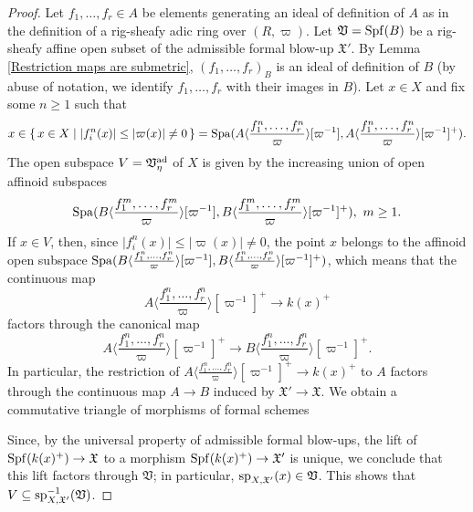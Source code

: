 \documentclass[12pt,twoside,a4paper]{article}
\theoremstyle{definition}
\theoremstyle{remark}
\newcommand\ad{{\rm ad}}
\newcommand\spc{{\rm sp}}
\newcommand\Spa{{\rm Spa}}
\newcommand\Spf{{\rm Spf}}
\begin{document}
\begin{proof}
Let $f_1,\dots, f_r\in A$ be elements generating an ideal of definition of $A$ as in the definition of a rig-sheafy adic ring over $(R, \varpi)$. Let $\mathfrak{V}=\Spf(B)$ be a rig-sheafy affine open subset of the admissible formal blow-up $\mathfrak{X}'$. By Lemma \ref{Restriction maps are submetric}, $(f_1,\dots, f_r)_{B}$ is an ideal of definition of $B$ (by abuse of notation, we identify $f_1,\dots, f_r$ with their images in $B$). Let $x\in X$ and fix some $n\geq1$ such that \begin{equation*}x\in \{\, x\in X\mid \vert f_{i}^{n}(x)\vert\leq\vert\varpi(x)\vert\neq 0\,\}=\Spa(A\langle\frac{f_1^{n},\dots, f_r^{n}}{\varpi}\rangle[\varpi^{-1}], A\langle\frac{f_1^{n},\dots, f_r^{n}}{\varpi}\rangle[\varpi^{-1}]^{+}).\end{equation*}The open subspace $V=\mathfrak{V}_{\eta}^{\ad}$ of $X$ is given by the increasing union of open affinoid subspaces \begin{equation*}\Spa(B\langle\frac{f_1^{m},\dots, f_r^{m}}{\varpi}\rangle[\varpi^{-1}], B\langle\frac{f_1^{m},\dots, f_r^{m}}{\varpi}\rangle[\varpi^{-1}]^{+}), \ m\geq1.\end{equation*}If $x\in V$, then, since $\vert f_{i}^{n}(x)\vert\leq \vert\varpi(x)\vert\neq 0$, the point $x$ belongs to the affinoid open subspace $\Spa(B\langle\frac{f_1^{n},\dots, f_r^{n}}{\varpi}\rangle[\varpi^{-1}], B\langle\frac{f_1^{n},\dots, f_r^{n}}{\varpi}\rangle[\varpi^{-1}]^{+})$, which means that the continuous map \begin{equation*}A\langle\frac{f_1^{n},\dots, f_r^{n}}{\varpi}\rangle[\varpi^{-1}]^{+}\to k(x)^{+}\end{equation*}factors through the canonical map \begin{equation*}A\langle\frac{f_1^{n},\dots, f_r^{n}}{\varpi}\rangle[\varpi^{-1}]^{+}\to B\langle\frac{f_1^{n},\dots, f_r^{n}}{\varpi}\rangle[\varpi^{-1}]^{+}.\end{equation*}In particular, the restriction of $A\langle\frac{f_1^{n},\dots, f_r^{n}}{\varpi}\rangle[\varpi^{-1}]^{+}\to k(x)^{+}$ to $A$ factors through the continuous map $A\to B$ induced by $\mathfrak{X}'\to \mathfrak{X}$. We obtain a commutative triangle of morphisms of formal schemes \begin{center}\end{center}Since, by the universal property of admissible formal blow-ups, the lift of $\Spf(k(x)^{+})\to \mathfrak{X}$ to a morphism $\Spf(k(x)^{+})\to \mathfrak{X}'$ is unique, we conclude that this lift factors through $\mathfrak{V}$; in particular, $\spc_{X,\mathfrak{X}'}(x)\in\mathfrak{V}$. This shows that $V\subseteq \spc_{X,\mathfrak{X}'}^{-1}(\mathfrak{V})$.


\end{proof}
\end{document}
